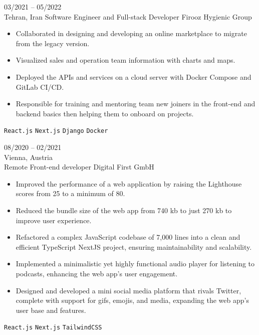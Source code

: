\documentclass[8pt]{developercv} %
\begin{document}
\begin{entrylist}
        \entry
        {03/2021 -- 05/2022 \\ Tehran, Iran}
        {Software Engineer {\small and} Full-stack Developer}
        {Firooz Hygienic Group}
        {\vspace{-10pt}
            \begin{itemize}[noitemsep,topsep=0pt,parsep=0pt,partopsep=0pt, leftmargin=-1pt]
                \item Collaborated in designing and developing an online marketplace to migrate from the legacy version.
                \item Visualized sales and operation team information with charts and maps.
                \item Deployed the APIs and services on a cloud server with Docker Compose and GitLab CI/CD.
                \item Responsible for training and mentoring team new joiners in the front-end and backend basics then helping them to onboard on projects.
            \end{itemize}
            \texttt{React.js} \slashsep \texttt{Next.js} \slashsep \texttt{Django} \slashsep \texttt{Docker}
        }

        \entry
        {08/2020 -- 02/2021 \\ Vienna, Austria \\ Remote}
        {Front-end developer}
        {Digital First GmbH}
        {\vspace{-10pt}
            \begin{itemize}[noitemsep,topsep=0pt,parsep=0pt,partopsep=0pt, leftmargin=-1pt]
                \item Improved the performance of a web application by raising the Lighthouse scores from 25 to a minimum of 80.
                \item Reduced the bundle size of the web app from 740 kb to just 270 kb to improve user experience.
                \item Refactored a complex JavaScript codebase of 7,000 lines into a clean and efficient TypeScript NextJS project, ensuring maintainability and scalability.
                \item Implemented a minimalistic yet highly functional audio player for listening to podcasts, enhancing the web app's user engagement.
                \item Designed and developed a mini social media platform that rivals Twitter, complete with support for gifs, emojis, and media, expanding the web app's user base and features.
            \end{itemize}
            \texttt{React.js} \slashsep \texttt{Next.js} \slashsep \texttt{TailwindCSS}
        }


\end{entrylist}
\end{document}
